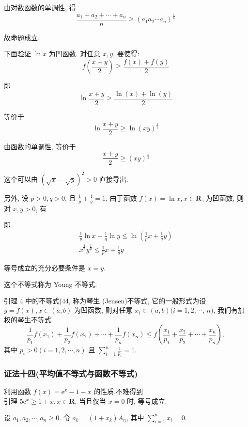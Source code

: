 由对数函数的单调性, 得
$$
\frac{a_{1}+a_{2}+\cdots+a_{n}}{n} \geqslant\left(a_{1} a_{2} \cdots a_{n}\right)^{\frac{1}{n}}
$$

故命题成立.

下面验证 $\ln x$ 为凹函数. 对任意 $x, y$, 要使得:
$$
f\left(\frac{x+y}{2}\right) \geqslant \frac{f(x)+f(y)}{2}
$$

即
$$
\ln \frac{x+y}{2} \geqslant \frac{\ln (x)+\ln (y)}{2}
$$

等价于
$$
\ln \frac{x+y}{2} \geqslant \ln (x y)^{\frac{1}{2}}
$$

由函数的单调性, 等价于
$$
\frac{x+y}{2} \geqslant(x y)^{\frac{1}{2}}
$$

这个可以由 $(\sqrt{x}-\sqrt{y})^{2}>0$ 直接导出.

另外, 设 $p>0, q>0$, 且 $\frac{1}{p}+\frac{1}{q}=1$, 由于函数 $f(x)=\ln x, x \in \mathbf{R}_{+}$为凹函数, 则对 $x, y>0$, 有

即
$$
\begin{gathered}
\frac{1}{p} \ln x+\frac{1}{q} \ln y \leqslant \ln \left(\frac{1}{p} x+\frac{1}{q} y\right) \\
x^{\frac{1}{p}} y^{\frac{1}{q}} \leqslant \frac{1}{p} x+\frac{1}{q} y
\end{gathered}
$$

等号成立的充分必要条件是 $x=y$.

这个不等式称为 Young 不等式.
\begin{note}
引理 4 中的不等式(44, 称为琴生 (Jensen)不等式, 它的一般形式为设 $y=f(x), x \in(a, b)$ 为凹函数, 则对任意 $x_{i} \in(a, b)(i=1,2, \cdots$, $n)$, 我们有加权的琴生不等式
$$
\frac{1}{p_{1}} f\left(x_{1}\right)+\frac{1}{p_{2}} f\left(x_{2}\right)+\cdots+\frac{1}{p_{n}} f\left(x_{n}\right) \leqslant f\left(\frac{x_{1}}{p_{1}}+\frac{x_{2}}{p_{2}}+\cdots+\frac{x_{n}}{p_{n}}\right),
$$
其中 $p_{i}>0(i=1,2, \cdots, n)$ 且 $\sum_{i=1}^{n} \frac{1}{p_{i}}=1$.
\end{note}


\subsubsection*{证法十四(平均值不等式与函数不等式)
}
利用函数 $f(x)=\mathrm{e}^{x}-1-x$ 的性质,不难得到\\
引理 $5 \mathrm{e}^{x} \geqslant 1+x, x \in \mathbf{R}$, 当且仅当 $x=0$ 时, 等号成立.

设 $a_{1}, a_{2}, \cdots, a_{n} \geqslant 0$. 令 $a_{k}=\left(1+x_{k}\right) A_{n}$, 其中 $\sum_{i=1}^{n} x_{i}=0$.

